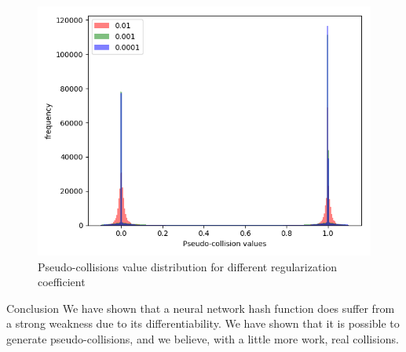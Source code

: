 \documentclass[final]{beamer}
\newlength{\onecolwid}
\begin{document}
\begin{frame}[t]
\begin{columns}[t]
\begin{column}{\onecolwid}
\begin{figure}
    \includegraphics[width=0.8\linewidth]{data_distribution}
        \caption{Pseudo-collisions value distribution for different regularization coefficient} 
        \label{fig:datadist}
\end{figure}



\begin{block}{Conclusion}
    We have shown that a neural network hash function does suffer from a strong
    weakness due to its differentiability. We have shown that it is possible
    to generate pseudo-collisions, and we believe, with a little more work,
    real collisions.
\end{block}






\end{column}
\end{columns}
\end{frame}
\end{document}
